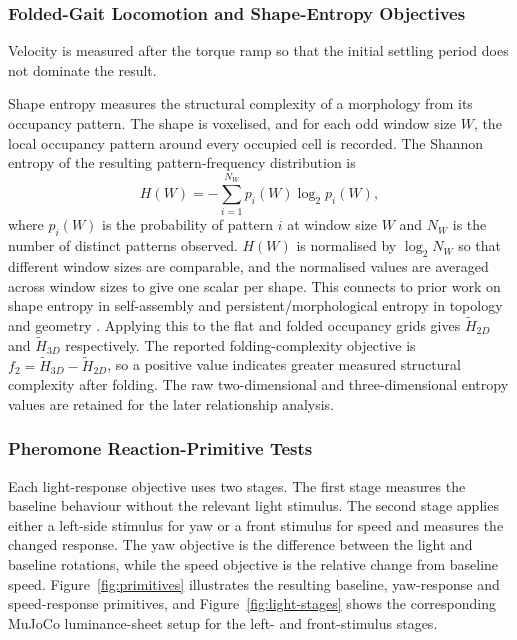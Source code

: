 \documentclass[12pt,a4paper]{report}
\begin{document}
\subsubsection{Folded-Gait Locomotion and Shape-Entropy Objectives}
Velocity is measured after the torque ramp so that the initial settling period does not dominate the result.

Shape entropy measures the structural complexity of a morphology from its occupancy pattern. The shape is voxelised, and for each odd window size $W$, the local occupancy pattern around every occupied cell is recorded. The Shannon entropy of the resulting pattern-frequency distribution is
\begin{equation}
H(W) = -\sum_{i=1}^{N_W} p_i(W)\log_2 p_i(W),
\label{eq:shape-entropy}
\end{equation}
where $p_i(W)$ is the probability of pattern $i$ at window size $W$ and $N_W$ is the number of distinct patterns observed. $H(W)$ is normalised by $\log_2 N_W$ so that different window sizes are comparable, and the normalised values are averaged across window sizes to give one scalar per shape. This connects to prior work on shape entropy in self-assembly \citep{van2014understanding, van2014entropically} and persistent/morphological entropy in topology and geometry \citep{atienza2019persistent, liu2024morphological}. Applying this to the flat and folded occupancy grids gives $\tilde H_{2D}$ and $\tilde H_{3D}$ respectively. The reported folding-complexity objective is $f_2=\tilde H_{3D}-\tilde H_{2D}$, so a positive value indicates greater measured structural complexity after folding. The raw two-dimensional and three-dimensional entropy values are retained for the later relationship analysis.

\subsubsection{Pheromone Reaction-Primitive Tests}
\label{sec:pheromone-tests}
Each light-response objective uses two stages. The first stage measures the baseline behaviour without the relevant light stimulus. The second stage applies either a left-side stimulus for yaw or a front stimulus for speed and measures the changed response. The yaw objective is the difference between the light and baseline rotations, while the speed objective is the relative change from baseline speed. Figure~\ref{fig:primitives} illustrates the resulting baseline, yaw-response and speed-response primitives, and Figure~\ref{fig:light-stages} shows the corresponding MuJoCo luminance-sheet setup for the left- and front-stimulus stages.
\end{document}
